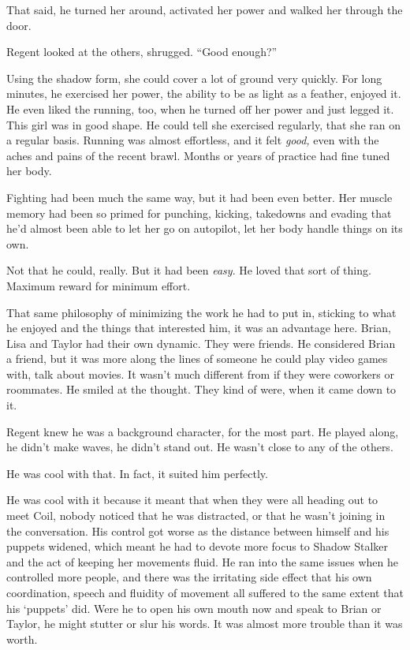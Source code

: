 That said, he turned her around, activated her power and walked her through the door.



Regent looked at the others, shrugged.  ``Good enough?''



Using the shadow form, she could cover a lot of ground very quickly.  For long minutes, he exercised her power, the ability to be as light as a feather, enjoyed it.  He even liked the running, too, when he turned off her power and just legged it.  This girl was in good shape.  He could tell she exercised regularly, that she ran on a regular basis.  Running was almost effortless, and it felt \emph{good, }even with the aches and pains of the recent brawl. Months or years of practice had fine tuned her body.



Fighting had been much the same way, but it had been even better.  Her muscle memory had been so primed for punching, kicking, takedowns and evading that he'd almost been able to let her go on autopilot, let her body handle things on its own.



Not that he could, really.  But it had been \emph{easy}.  He loved that sort of thing.  Maximum reward for minimum effort.



That same philosophy of minimizing the work he had to put in, sticking to what he enjoyed and the things that interested him, it was an advantage here.  Brian, Lisa and Taylor had their own dynamic.  They were friends.  He considered Brian a friend, but it was more along the lines of someone he could play video games with, talk about movies.  It wasn't much different from if they were coworkers or roommates.  He smiled at the thought.  They kind of were, when it came down to it.



Regent knew he was a background character, for the most part.  He played along, he didn't make waves, he didn't stand out.  He wasn't close to any of the others.



He was cool with that.  In fact, it suited him perfectly.



He was cool with it because it meant that when they were all heading out to meet Coil, nobody noticed that he was distracted, or that he wasn't joining in the conversation.  His control got worse as the distance between himself and his puppets widened, which meant he had to devote more focus to Shadow Stalker and the act of keeping her movements fluid.  He ran into the same issues when he controlled more people, and there was the irritating side effect that his own coordination, speech and fluidity of movement all suffered to the same extent that his `puppets' did.  Were he to open his own mouth now and speak to Brian or Taylor, he might stutter or slur his words.  It was almost more trouble than it was worth.



